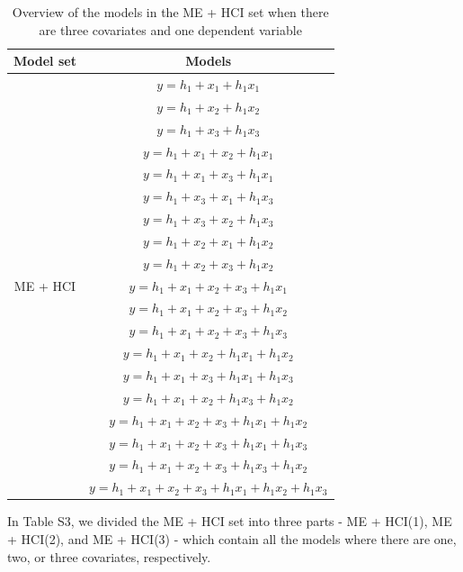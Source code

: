 \begin{table}[hbt!]
\caption{}
\caption*{Overview of the models in the ME + HCI set when there are three covariates and one dependent variable}
\centering
\begin{tabular}{cc}
\toprule
Model set & Models \\ 
\midrule
\multirow{19}{*}{ME + HCI} & $y=h_1+x_1+h_1x_1$\\ &  $y=h_1+x_2+h_1x_2$\\ &  $y=h_1+x_3+h_1x_3$\\ & $y=h_1+x_1+x_2+h_1x_1$\\ & $y=h_1+x_1+x_3+h_1x_1$\\ & $y=h_1+x_3+x_1+h_1x_3$\\ & $y=h_1+x_3+x_2+h_1x_3$\\ & $y=h_1+x_2+x_1+h_1x_2$\\ & $y=h_1+x_2+x_3+h_1x_2$\\ & $y=h_1+x_1+x_2+x_3+h_1x_1$\\ & $y=h_1+x_1+x_2+x_3+h_1x_2$\\ & $y=h_1+x_1+x_2+x_3+h_1x_3$\\ & $y=h_1+x_1+x_2+h_1x_1+h_1x_2$\\ & $y=h_1+x_1+x_3+h_1x_1+h_1x_3$\\ & $y=h_1+x_1+x_2+h_1x_3+h_1x_2$\\ & $y=h_1+x_1+x_2+x_3+h_1x_1+h_1x_2$\\ & $y=h_1+x_1+x_2+x_3+h_1x_1+h_1x_3$\\ & $y=h_1+x_1+x_2+x_3+h_1x_3+h_1x_2$\\ & $y=h_1+x_1+x_2+x_3+h_1x_1+h_1x_2+h_1x_3$\\  
\bottomrule
\end{tabular}
\end{table}

In Table S3, we divided the ME + HCI set into three parts - ME + HCI(1), ME + HCI(2), and ME + HCI(3) - which contain all the models where there are one, two, or three covariates, respectively. \\

